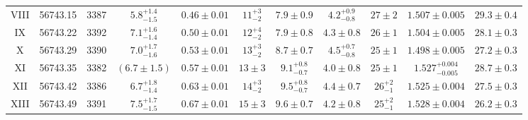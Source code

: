 \documentclass[a4paper,fleqn,usenatbib]{mnras}
\begin{document}
\begin{table}
\begin{tabular}{|c|c|c|c|c|c|c|c|c|c|c|}
VIII & 56743.15 & 3387 & $5.8_{-1.5}^{+1.4}$ & $0.46\pm0.01$ & $11_{-2}^{+3}$ & $7.9\pm0.9$ & $4.2_{-0.8}^{+0.9}$ & $27\pm2$ & $1.507\pm0.005$ & $29.3\pm0.4$ \\
IX & 56743.22 & 3392 & $7.1_{-1.4}^{+1.6}$ & $0.50\pm0.01$ & $12_{-2}^{+4}$ & $7.9\pm0.8$ & $4.3\pm0.8$ & $26\pm1$ & $1.504\pm0.005$ & $28.1\pm0.3$ \\
X & 56743.29 & 3390 & $7.0_{-1.6}^{+1.7}$ & $0.53\pm0.01$ & $13_{-2}^{+3}$ & $8.7\pm0.7$ & $4.5_{-0.8}^{+0.7}$ & $25\pm1$ & $1.498\pm0.005$ & $27.2\pm0.3$ \\
XI & 56743.35 & 3382 & $(6.7\pm1.5)$ & $0.57\pm0.01$ & $13\pm3$ & $9.1_{-0.7}^{+0.8}$ & $4.0\pm0.8$ & $25\pm1$ & $1.527_{-0.005}^{+0.004}$ & $28.7\pm0.3$ \\
XII & 56743.42 & 3386 & $6.7_{-1.4}^{+1.8}$ & $0.63\pm0.01$ & $14_{-2}^{+3}$ & $9.5_{-0.7}^{+0.8}$ & $4.4\pm0.7$ & $26_{-1}^{+2}$ & $1.525\pm0.004$ & $27.5\pm0.3$ \\
XIII & 56743.49 & 3391 & $7.5_{-1.5}^{+1.7}$ & $0.67\pm0.01$ & $15\pm3$ & $9.6\pm0.7$ & $4.2\pm0.8$ & $25_{-1}^{+2}$ & $1.528\pm0.004$ & $26.2\pm0.3$ \\
\hline
\end{tabular}
\end{table}

\end{document}
